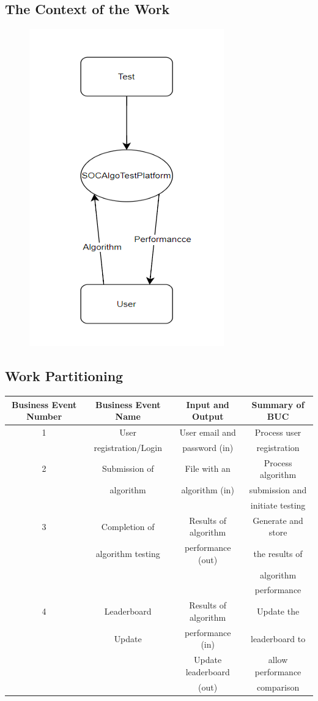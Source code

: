 \documentclass[12pt]{article}
\begin{document}
\subsection{The Context of the Work}
\begin{figure}[H]
    \centering
    \includegraphics[width=0.5\linewidth]{diagrams/context.png}
\end{figure}
\subsection{Work Partitioning}

\begin{table}[H]
    \centering
    \begin{tabular}{| c | c | c | c |}
    \hline
         Business Event Number & Business Event Name & Input and Output & Summary of BUC \\
    \hline
         1 & User & User email and & Process user \\
         & registration/Login & password (in) & registration \\
        \hline
         2 & Submission of & File with an & Process algorithm \\
          & algorithm & algorithm (in) & submission and \\
          & & & initiate testing \\
         \hline
         3 & Completion of & Results of algorithm & Generate and store \\
         & algorithm testing & performance (out) & the results of \\
         & & & algorithm \\
         & & & performance \\
         \hline
         4 & Leaderboard & Results of algorithm & Update the \\
          & Update & performance (in) & leaderboard to \\
          & & Update leaderboard & allow performance \\
          & & (out) & comparison\\
 \hline
    \end{tabular}
\end{table}
\end{document}
